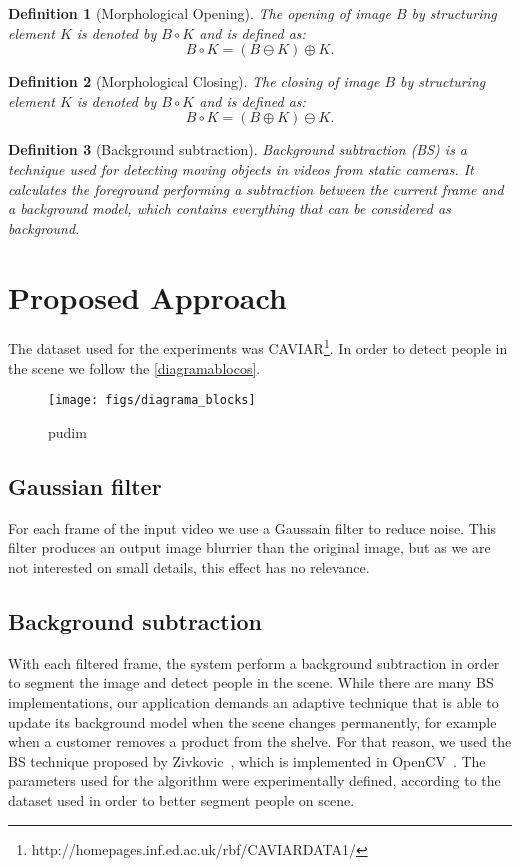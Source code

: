 \documentclass[10pt, conference]{IEEEtran}
\newtheorem{definition}{Definition}
\begin{document}
\begin{definition}[Morphological Opening]
The opening of image $B$ by structuring	element $K$ is denoted by $B \circ K$ and is defined as: $$B \circ K =(B \ominus K) \oplus K.$$
\end{definition}

\begin{definition}[Morphological Closing]
The closing of image $B$ by structuring	element $K$ is denoted by $B \circ K$ and is defined as: $$B \circ K =(B \oplus K) \ominus K.$$
\end{definition}

\begin{definition}[Background subtraction]
Background subtraction (BS) is a technique used for detecting moving objects in videos from static cameras. It calculates the foreground performing a subtraction between the current frame and a background model, which contains everything that can be considered as background.
\end{definition}

\section{Proposed Approach}
The dataset used for the experiments was CAVIAR\footnote{http://homepages.inf.ed.ac.uk/rbf/CAVIARDATA1/}. In order to detect people in the scene we follow the \autoref{diagramablocos}.
\begin{figure}[h]
	\centering
	\texttt{[image: figs/diagrama\_blocks]}
	\caption{pudim}
	\label{diagramablocos}
\end{figure}

\subsection{Gaussian filter}
	For each frame of the input video we use a Gaussain filter to reduce noise. This filter produces an output image blurrier than the original image, but as we are not interested on small details, this effect has no relevance.
\subsection{Background subtraction}
	With each filtered frame, the system perform a background subtraction in order to segment the image and detect people in the scene. While there are many BS implementations, our application demands an adaptive technique that is able to update its background model when the scene changes permanently, for example when a customer removes a product from the shelve. For that reason, we used the BS technique proposed by Zivkovic~\cite{zivkovic2004improved}, which is implemented in OpenCV~\cite{opencv_library}. The parameters used for the algorithm were experimentally defined, according to the dataset used in order to better segment people on scene.
\end{document}
